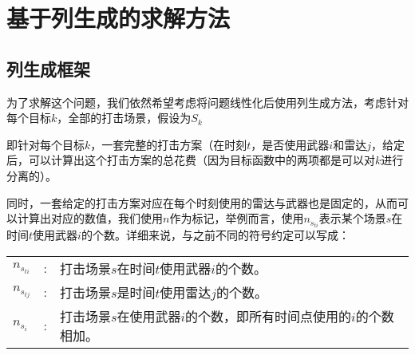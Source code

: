 

\section{基于列生成的求解方法}
\subsection{列生成框架}
为了求解这个问题，我们依然希望考虑将问题线性化后使用列生成方法，考虑针对每个目标$k$，全部的打击场景，假设为$S_k$

即针对每个目标$k$，一套完整的打击方案（在时刻$t$，是否使用武器$i$和雷达$j$，给定后，可以计算出这个打击方案的总花费（因为目标函数中的两项都是可以对$k$进行分离的）。

同时，一套给定的打击方案对应在每个时刻使用的雷达与武器也是固定的，从而可以计算出对应的数值，我们使用$n$作为标记，举例而言，使用$n_{s_{ti}}$表示某个场景$s$在时间$t$使用武器$i$的个数。详细来说，与之前不同的符号约定可以写成：
\begin{table}[ht]
    \begin{tabularx}{\textwidth}{llX}
        $n_{s_{ti}}$ & : & 打击场景$s$在时间$t$使用武器$i$的个数。\\
        $n_{s_{tj}}$ & : & 打击场景$s$是时间$t$使用雷达$j$的个数。\\
        $n_{s_{i}}$ & : & 打击场景$s$在使用武器$i$的个数，即所有时间点使用的$i$的个数相加。
    \end{tabularx}
\end{table}

